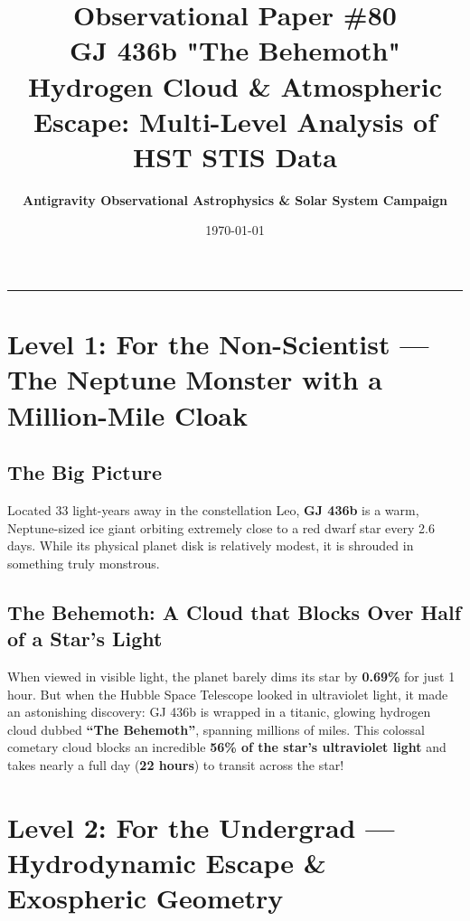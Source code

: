 \documentclass[11pt,a4paper]{article}
\title{\Huge \textbf{Observational Paper \#80}\\ \Large GJ 436b "The Behemoth" Hydrogen Cloud \& Atmospheric Escape: Multi-Level Analysis of HST STIS Data}
\author{\textbf{Antigravity Observational Astrophysics \& Solar System Campaign}}
\date{\today}
\begin{document}
\maketitle

\vspace{-1em}
\begin{center}
\rule{\textwidth}{1.5pt}
\end{center}

\section*{Level 1: For the Non-Scientist — The Neptune Monster with a Million-Mile Cloak}

\subsection*{The Big Picture}
Located 33 light-years away in the constellation Leo, \textbf{GJ 436b} is a warm, Neptune-sized ice giant orbiting extremely close to a red dwarf star every 2.6 days. While its physical planet disk is relatively modest, it is shrouded in something truly monstrous.

\subsection*{The Behemoth: A Cloud that Blocks Over Half of a Star's Light}
When viewed in visible light, the planet barely dims its star by \textbf{0.69\%} for just 1 hour. But when the Hubble Space Telescope looked in ultraviolet light, it made an astonishing discovery: GJ 436b is wrapped in a titanic, glowing hydrogen cloud dubbed \textbf{``The Behemoth''}, spanning millions of miles. This colossal cometary cloud blocks an incredible \textbf{56\% of the star's ultraviolet light} and takes nearly a full day (\textbf{22 hours}) to transit across the star!

\newpage

\section*{Level 2: For the Undergrad — Hydrodynamic Escape \& Exospheric Geometry}
\end{document}
